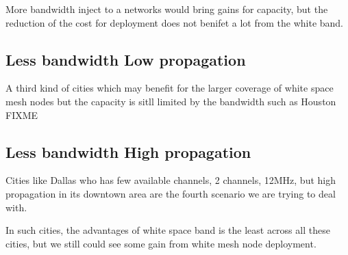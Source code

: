 More bandwidth inject to a networks would bring gains for capacity, but the reduction of the cost for deployment does not benifet a lot from the white band.

\subsection{Less bandwidth Low propagation}
A third kind of cities which may benefit for the larger coverage of white space mesh nodes but the capacity is sitll limited by the bandwidth such as Houston FIXME



\subsection{Less bandwidth High propagation}
Cities like Dallas who has few available channels, 2 channels, 12MHz, but high propagation in its downtown area are the fourth scenario we are trying to deal with.

In such cities, the advantages of white space band is the least across all these cities, but we still could see some gain from white mesh node deployment.




